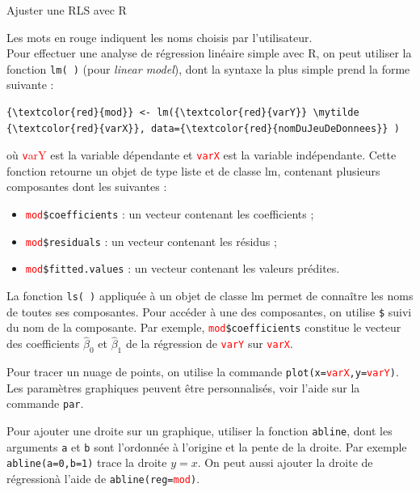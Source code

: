 \documentclass[letter, 11pt]{article}
\newcommand{\mytilde}{$\sim$}
\begin{document}
\vspace*{0.01 cm}
\begin{center}
{\Large Ajuster une RLS avec R}
\end{center}

Les mots en rouge indiquent les noms choisis par l'utilisateur.\\

Pour effectuer une analyse de régression linéaire simple avec R, on peut utiliser la fonction {\tt lm( )} (pour {\it linear model}), dont la syntaxe la plus simple prend la forme suivante :


\begin{Verbatim}[commandchars=\\\{\}]
{\textcolor{red}{mod}} <- lm({\textcolor{red}{varY}} \mytilde {\textcolor{red}{varX}}, data={\textcolor{red}{nomDuJeuDeDonnees}} )
\end{Verbatim}
où {\textcolor{red}{\texttt varY}} est la variable dépendante et {\textcolor{red}{\tt varX}} est la variable indépendante. 
Cette fonction retourne un objet de type liste et de classe lm, contenant plusieurs composantes dont les suivantes :
\begin{itemize}
\item \texttt{{\textcolor{red}{mod}}\$coefficients} : un vecteur contenant les coefficients ;
\item \texttt{{\textcolor{red}{mod}}\$residuals} : un vecteur contenant les résidus ;
\item \texttt{{\textcolor{red}{mod}}\$fitted.values} : un vecteur contenant les valeurs prédites.
\end{itemize}


La fonction \texttt{ls( )} appliquée à un objet de classe lm permet de connaître les noms de toutes ses composantes.
Pour accéder à une des composantes, on utilise {\tt \$} suivi du nom de la composante. Par exemple, {\tt {\textcolor{red}{mod}}\$coefficients} constitue le vecteur des coefficients $\hat\beta_0$ et $\hat\beta_1$ de la régression de {\textcolor{red}{\tt varY}} sur {\textcolor{red}{\tt varX}}.

\vspace{0.1in}
Pour tracer un nuage de points, on utilise la commande {\tt plot(x={\textcolor{red}{varX}},y={\textcolor{red}{varY}})}. Les paramètres graphiques peuvent être personnalisés, voir l'aide sur la commande {\tt par}.

\vspace{0.1in}
Pour ajouter une droite sur un graphique, utiliser la fonction \texttt{abline}, dont les arguments {\tt a} et  {\tt b} sont l’ordonnée à l’origine et la pente de la droite. Par exemple {\tt abline(a=0,b=1)} trace la droite $y=x$. On peut aussi ajouter la droite de régressionà l'aide de {\tt abline(reg={\textcolor{red}{mod}})}.
\end{document}
